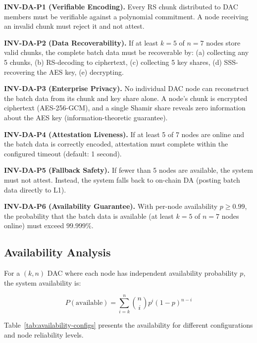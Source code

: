 \textbf{INV-DA-P1 (Verifiable Encoding).}
Every RS chunk distributed to DAC members must be verifiable against a
polynomial commitment. A node receiving an invalid chunk must reject it
and not attest.

\textbf{INV-DA-P2 (Data Recoverability).}
If at least $k = 5$ of $n = 7$ nodes store valid chunks, the complete
batch data must be recoverable by: (a) collecting any 5 chunks,
(b) RS-decoding to ciphertext, (c) collecting 5 key shares,
(d) SSS-recovering the AES key, (e) decrypting.

\textbf{INV-DA-P3 (Enterprise Privacy).}
No individual DAC node can reconstruct the batch data from its chunk and
key share alone. A node's chunk is encrypted ciphertext (AES-256-GCM),
and a single Shamir share reveals zero information about the AES key
(information-theoretic guarantee).

\textbf{INV-DA-P4 (Attestation Liveness).}
If at least 5 of 7 nodes are online and the batch data is correctly
encoded, attestation must complete within the configured timeout
(default: 1 second).

\textbf{INV-DA-P5 (Fallback Safety).}
If fewer than 5 nodes are available, the system must not attest. Instead,
the system falls back to on-chain DA (posting batch data directly to L1).

\textbf{INV-DA-P6 (Availability Guarantee).}
With per-node availability $p \geq 0.99$, the probability that the batch
data is available (at least $k = 5$ of $n = 7$ nodes online) must exceed
$99.999\%$.

\subsection{Availability Analysis}

For a $(k,n)$ DAC where each node has independent availability
probability $p$, the system availability is:

\begin{equation}
P(\text{available}) = \sum_{i=k}^{n} \binom{n}{i} p^i (1-p)^{n-i}
\label{eq:availability}
\end{equation}

Table~\ref{tab:availability-configs} presents the availability for
different configurations and node reliability levels.

